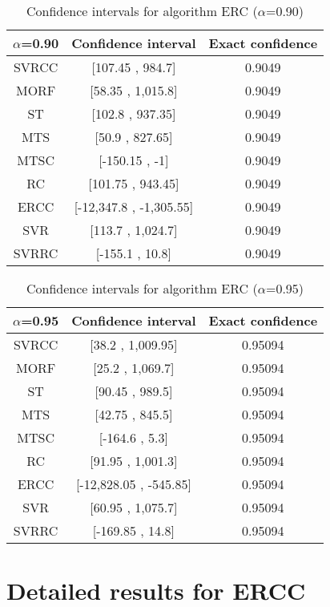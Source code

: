 \documentclass[a4paper,10pt]{article}
\begin{document}
\begin{table}[!htp]
\centering\small
\begin{tabular}{
|c|c|c|}
\hline
 $\alpha$=0.90 & Confidence interval & Exact confidence \\ \hline 
SVRCC & [107.45 , 984.7] & 0.9049\\ \hline 
MORF & [58.35 , 1,015.8] & 0.9049\\ \hline 
ST & [102.8 , 937.35] & 0.9049\\ \hline 
MTS & [50.9 , 827.65] & 0.9049\\ \hline 
MTSC & [-150.15 , -1] & 0.9049\\ \hline 
RC & [101.75 , 943.45] & 0.9049\\ \hline 
ERCC & [-12,347.8 , -1,305.55] & 0.9049\\ \hline 
SVR & [113.7 , 1,024.7] & 0.9049\\ \hline 
SVRRC & [-155.1 , 10.8] & 0.9049\\ \hline 

\end{tabular}
\caption{Confidence intervals for algorithm ERC ($\alpha$=0.90)}
\end{table}
\begin{table}[!htp]
\centering\small
\begin{tabular}{
|c|c|c|}
\hline
 $\alpha$=0.95 & Confidence interval & Exact confidence \\ \hline 
SVRCC & [38.2 , 1,009.95] & 0.95094\\ \hline 
MORF & [25.2 , 1,069.7] & 0.95094\\ \hline 
ST & [90.45 , 989.5] & 0.95094\\ \hline 
MTS & [42.75 , 845.5] & 0.95094\\ \hline 
MTSC & [-164.6 , 5.3] & 0.95094\\ \hline 
RC & [91.95 , 1,001.3] & 0.95094\\ \hline 
ERCC & [-12,828.05 , -545.85] & 0.95094\\ \hline 
SVR & [60.95 , 1,075.7] & 0.95094\\ \hline 
SVRRC & [-169.85 , 14.8] & 0.95094\\ \hline 

\end{tabular}
\caption{Confidence intervals for algorithm ERC ($\alpha$=0.95)}
\end{table}

 \clearpage 


\section{Detailed results for ERCC}
\end{document}

